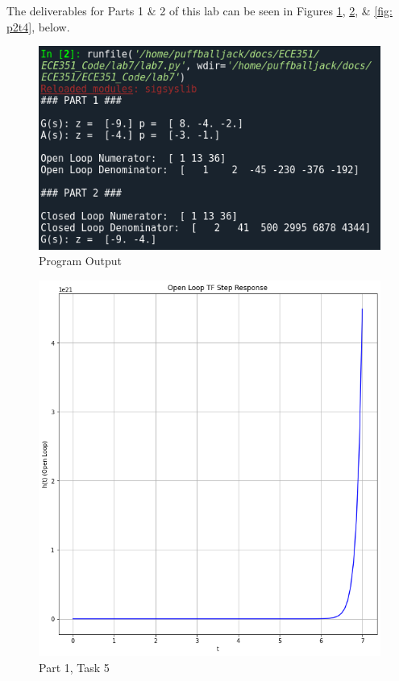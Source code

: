 \documentclass[12pt]{report}
\begin{document}
The deliverables for Parts 1 \& 2 of this lab can be seen in Figures \ref{fig: p1t2}, \ref{fig: p1t5}, \& \ref{fig: p2t4}, below.
\\
\begin{figure}[h!]
  \centering
  \includegraphics[scale=.7]{p1t2.png}
  \caption{Program Output}
  \label{fig: p1t2}
\end{figure}
\begin{figure}[h!]
  \centering
  \includegraphics[scale=0.5]{p1t5.png}
  \caption{Part 1, Task 5}
  \label{fig: p1t5}
\end{figure}
\end{document}

